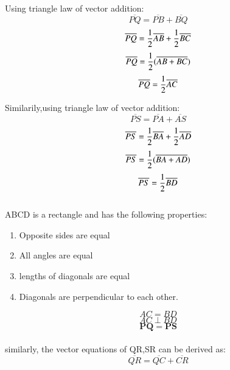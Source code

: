 \documentclass[journal,10pt,twocolumn]{article}
\begin{document}
Using triangle law of vector addition:
\begin{equation}
	\overline{PQ}= \overline{PB} + \overline{BQ} 
\end{equation}
\begin{equation}
		  \overline{PQ}  = \frac{1}{2}\overline{AB} + \frac{1}{2}\overline{BC} \\
\end{equation}
\begin{equation}
	\overline{PQ} =\frac{1}{2}(\overline{AB+BC})\\
\end{equation}
\begin{equation}
	  \overline{PQ} =\frac{1}{2}\overline{AC} \\
\end{equation}

Similarily,using triangle law of vector addition:
\begin{equation}
	\overline{PS}= \overline{PA} + \overline{AS} 
\end{equation}
\begin{equation}
		  \overline{PS}  = \frac{1}{2}\overline{BA} + \frac{1}{2}\overline{AD} \\
\end{equation}
\begin{equation}
	\overline{PS} =\frac{1}{2}(\overline{BA+AD})\\
\end{equation}
\begin{equation}
	  \overline{PS} =\frac{1}{2}\overline{BD} \\
\end{equation}
\\ABCD is a rectangle and has the following properties:
\begin{enumerate}
	\item Opposite sides are equal
\item All angles are equal
\item lengths of diagonals are equal
\item Diagonals are perpendicular to each other.
\end{enumerate}
	\begin{equation}
AC = BD 
	\end{equation}
	\begin{equation}
		AC \perp BD
	\end{equation}
	\begin{equation}
		\boldsymbol{PQ} = \boldsymbol{PS}
	\end{equation}
\\ similarly, the vector equations of QR,SR can be derived as:
\begin{equation}
	\overline{QR}= \overline{QC} + \overline{CR} 
\end{equation}
	
\end{document}
